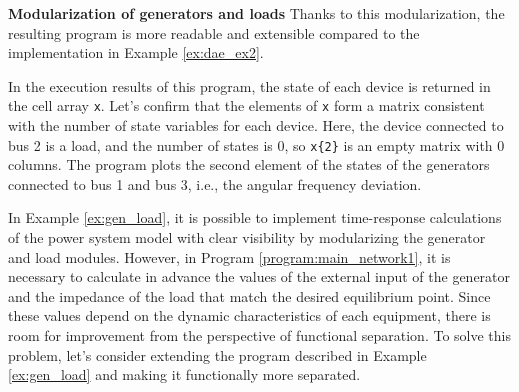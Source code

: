 \documentclass[graybox, envcountchap]{svmult}
\begin{document}
\begin{example}{\textbf{Modularization of generators and loads}}
Thanks to this modularization, the resulting program is more readable and
extensible compared to the implementation in Example \ref{ex:dae_ex2}.

In the execution results of this program, the state of each device is returned
in the cell array \verb|x|. Let's confirm that the elements of \verb|x| form a
matrix consistent with the number of state variables for each device. Here, the
device connected to bus 2 is a load, and the number of states is 0, so
\verb|x{2}| is an empty matrix with 0 columns. The program plots the second
element of the states of the generators connected to bus 1 and bus 3, i.e., the
angular frequency deviation.

\end{example}

In Example \ref{ex:gen_load}, it is possible to implement time-response
calculations of the power system model with clear visibility by modularizing the
generator and load modules. However, in Program \ref{program:main_network1}, it
is necessary to calculate in advance the values of the external input of the
generator and the impedance of the load that match the desired equilibrium
point. Since these values depend on the dynamic characteristics of each
equipment, there is room for improvement from the perspective of functional
separation. To solve this problem, let's consider extending the program
described in Example \ref{ex:gen_load} and making it functionally more
separated.
\end{document}
